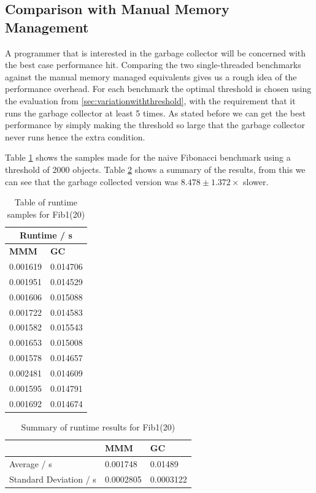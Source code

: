 \documentclass[../diss.tex]{subfiles}
\begin{document}
\subsection{Comparison with Manual Memory Management}

A programmer that is interested in the garbage collector will be concerned with the best case performance hit. Comparing the two single-threaded benchmarks against the manual memory managed equivalents gives us a rough idea of the performance overhead. For each benchmark the optimal threshold is chosen using the evaluation from \cref{sec:variationwiththreshold}, with the requirement that it runs the garbage collector at least 5 times. As stated before we can get the best performance by simply making the threshold so large that the garbage collector never runs hence the extra condition.

Table \ref{tab:fibsamples} shows the samples made for the naive Fibonacci benchmark using a threshold of 2000 objects. Table \ref{tab:fibsummary} shows a summary of the results, from this we can see that the garbage collected version was $8.478 \pm 1.372\times$ slower.

\begin{table}
    \centering
    \begin{tabular}{| l | l |}
        \hline
         \multicolumn{2}{|c|}{\bf{Runtime / s}} \\ \hline
         \bf{MMM} & \bf{GC} \\ \hline
         0.001619 & 0.014706 \\ \hline
         0.001951 & 0.014529 \\ \hline
         0.001606 & 0.015088 \\ \hline
         0.001722 & 0.014583 \\ \hline
         0.001582 & 0.015543 \\ \hline
         0.001653 & 0.015008 \\ \hline
         0.001578 & 0.014657 \\ \hline
         0.002481 & 0.014609 \\ \hline
         0.001595 & 0.014791 \\ \hline
         0.001692 & 0.014674 \\ \hline
    \end{tabular}
    \caption{Table of runtime samples for Fib1(20)}
    \label{tab:fibsamples}
\end{table}

\begin{table}
    \centering
    \begin{tabular}{| l | l | l |}
        \hline
         & \bf{MMM} & \bf{GC} \\ \hline
         Average / s & 0.001748 & 0.01489 \\ \hline
         Standard Deviation / s & 0.0002805 & 0.0003122 \\ \hline
        
    \end{tabular}
    \caption{Summary of runtime results for Fib1(20)}
    \label{tab:fibsummary}
\end{table}
\end{document}
